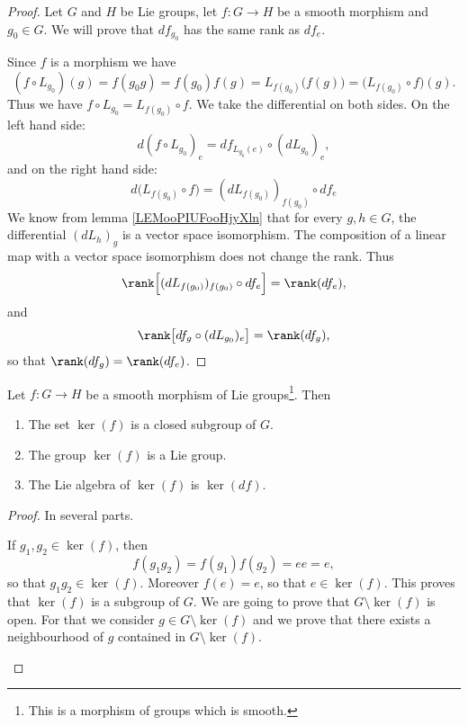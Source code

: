\begin{theorem}
\begin{proof}
	Let \( G\) and \( H\) be Lie groups, let \( f\colon G\to H\) be a smooth morphism and \( g_0\in G\). We will prove that \( df_{g_0}\) has the same rank as \( df_e\).

	Since \( f\) is a morphism we have
	\begin{equation}
		(f\circ L_{g_0})(g)=f(g_0g)=f(g_0)f(g)=L_{f(g_0)}\big( f(g) \big)=\big( L_{f(g_0)}\circ f \big)(g).
	\end{equation}
	Thus we have \( f\circ L_{g_0}=L_{f(g_0)}\circ f\). We take the differential on both sides. On the left hand side:
	\begin{equation}
		d(f\circ L_{g_0})_e=df_{L_{g_0}(e)}\circ(dL_{g_0})_e,
	\end{equation}
	and on the right hand side:
	\begin{equation}
		d\big( L_{f(g_0)}\circ f \big)=(dL_{f(g_0)})_{f(g_0)}\circ df_e
	\end{equation}
	We know from lemma \ref{LEMooPIUFooHjyXln} that for every \( g,h\in G\), the differential \( (dL_h)_g\) is a vector space isomorphism. The composition of a linear map with a vector space isomorphism does not change the rank. Thus
	\begin{equation}
		\rank\Big[ (dL_{f(g_0)})_{f(g_0)}\circ df_e \Big]=\rank(df_e),
	\end{equation}
	and
	\begin{equation}
		\rank\big[ df_g\circ(dL_{g_0})_e \big]=\rank(df_g),
	\end{equation}
	so that \( \rank(df_g)=\rank(df_e)\).
\end{proof}

\begin{proposition}
	Let \( f\colon G\to H\) be a smooth morphism of Lie groups\footnote{This is a morphism of groups which is smooth.}. Then
	\begin{enumerate}
		\item
		      The set \( \ker(f)\) is a closed subgroup of \( G\).
		\item
		      The group \( \ker(f)\) is a Lie group.
		\item
		      The Lie algebra of \( \ker(f)\) is \( \ker(df)\).
	\end{enumerate}
\end{proposition}

\begin{proof}
	In several parts.
	\begin{subproof}
		If \( g_1,g_2\in \ker(f)\), then
		\begin{equation}
			f(g_1g_2)=f(g_1)f(g_2)=ee=e,
		\end{equation}
		so that \( g_1g_2\in\ker(f)\). Moreover \( f(e)=e\), so that \( e\in \ker(f)\). This proves that \( \ker(f)\) is a subgroup of \( G\).
		We are going to prove that \( G\setminus\ker(f)\) is open. For that we consider \( g\in G\setminus\ker(f)\) and we prove that there exists a neighbourhood of \( g\) contained in \( G\setminus\ker(f)\).


\end{subproof}
\end{proof}
\end{theorem}
